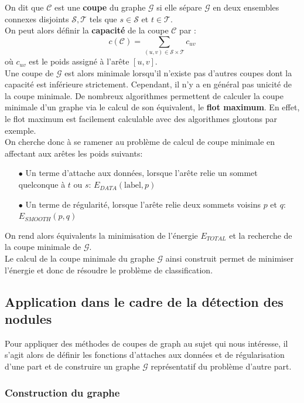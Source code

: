 \documentclass{article}
\newcommand{\lab}{\text{label}}
\begin{document}
On dit que $\mathcal{C}$ est une \textbf{coupe} du graphe $\mathcal{G}$ si elle sépare $\mathcal{G}$ en deux ensembles connexes disjoints $\mathcal{S},\mathcal{T}$ tels que  
$s \in \mathcal{S}$ et $t \in \mathcal{T}$.\\
On peut alors définir la \textbf{capacité} de la coupe $\mathcal{C}$ par :
\[
	c(\mathcal{C}) = \sum_{(u,v) \in \mathcal{S} \times \mathcal{T}} c_{uv}
\]
où $c_{uv}$ est le poids assigné à l'arête $[u,v]$.\\
Une coupe de $\mathcal{G}$ est alors minimale lorsqu'il n'existe pas d'autres coupes dont la capacité est inférieure strictement. Cependant, il n'y a en général pas unicité de la coupe minimale. De nombreux algorithmes permettent de calculer la coupe minimale d'un graphe via le calcul de son équivalent, le \textbf{flot maximum}. En effet, le flot maximum est facilement calculable avec des algorithmes gloutons par exemple. \\
On cherche donc à se ramener au problème de calcul de coupe minimale en affectant aux arêtes les poids suivants:
\begin{itemize}
	\item[$\bullet$] Un terme d'attache aux données, lorsque l'arête relie un sommet quelconque à $t$ ou $s$: $E_{DATA}(\lab, p)$
	\item[$\bullet$] Un terme de régularité, lorsque l'arête relie deux sommets voisins $p$ et $q$: $E_{SMOOTH}(p,q)$
\end{itemize}
On rend alors équivalents la minimisation de l'énergie $E_{TOTAL}$ et la recherche de la coupe minimale de $\mathcal{G}$.\\
Le calcul de la coupe minimale du graphe $\mathcal{G}$ ainsi construit permet de minimiser l'énergie et donc de résoudre le problème de classification.

\subsection{Application dans le cadre de la détection des nodules}

Pour appliquer des méthodes de coupes de graph au sujet qui nous intéresse, il s'agit alors de définir les fonctions d'attaches aux données et de régularisation d'une part et de construire un graphe $\mathcal{G}$ représentatif du problème d'autre part.

\subsubsection{Construction du graphe}
\end{document}

